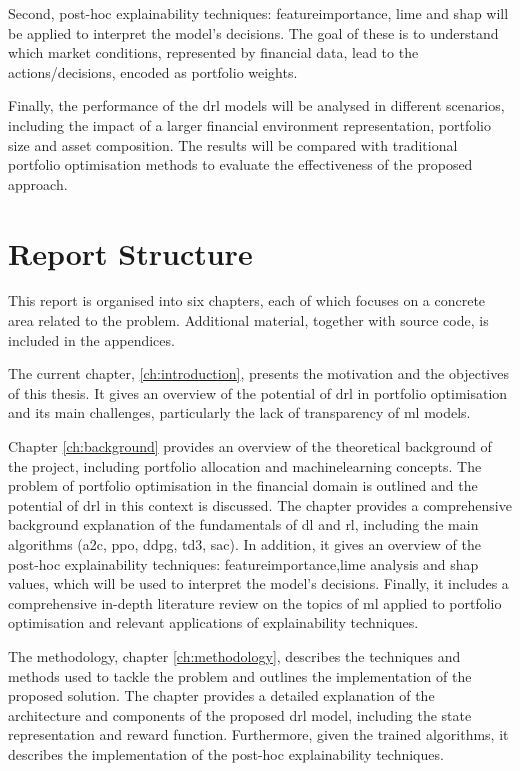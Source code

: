 Second, post-hoc explainability techniques: \Gls{featureimportance}, \acrfull{lime} and \acrfull{shap} will be applied to interpret the model's decisions. The goal of these is to understand which market conditions, represented by financial data, lead to the actions/decisions, encoded as portfolio weights. 

Finally, the performance of the \acrshort{drl} models will be analysed in different scenarios, including the impact of a larger financial environment representation, portfolio size and asset composition. The results will be compared with traditional portfolio optimisation methods to evaluate the effectiveness of the proposed approach.

\section{Report Structure} \label{sec:introduction-structure}

This report is organised into six chapters, each of which focuses on a concrete area related to the problem. Additional material, together with source code, is included in the appendices. 

The current chapter, \ref{ch:introduction}, presents the motivation and the objectives of this thesis. It gives an overview of the potential of \acrshort{drl} in portfolio optimisation and its main challenges, particularly the lack of transparency of \acrshort{ml} models. 

Chapter \ref{ch:background} provides an overview of the theoretical background of the project, including portfolio allocation and \acrlong{machinelearning} concepts. The problem of portfolio optimisation in the financial domain is outlined and the potential of \acrshort{drl} in this context is discussed. The chapter provides a comprehensive background explanation of the fundamentals of \acrlong{dl} and \acrlong{rl}, including the main algorithms (\acrshort{a2c}, \acrshort{ppo}, \acrshort{ddpg}, \acrshort{td3}, \acrshort{sac}). In addition, it gives an overview of the post-hoc explainability techniques: \Gls{featureimportance},\acrfull{lime} analysis and \acrfull{shap} values, which will be used to interpret the model's decisions. Finally, it includes a comprehensive in-depth literature review on the topics of \acrshort{ml} applied to portfolio optimisation and relevant applications of explainability techniques. 

The methodology, chapter \ref{ch:methodology}, describes the techniques and methods used to tackle the problem and outlines the implementation of the proposed solution. The chapter provides a detailed explanation of the architecture and components of the proposed \acrshort{drl} model, including the state representation and reward function. Furthermore, given the trained algorithms, it describes the implementation of the post-hoc explainability techniques.

